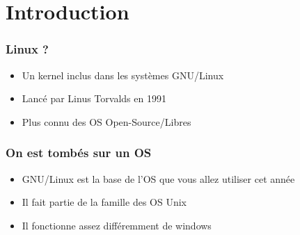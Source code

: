 \section*{Introduction}

\begin{frame}
    \frametitle{Linux ?}
        \begin{itemize}
            \item Un kernel inclus dans les systèmes GNU/Linux
            \item Lancé par Linus Torvalds en 1991
            \item Plus connu des OS Open-Source/Libres
        \end{itemize}
\end{frame}

\begin{frame}
	\frametitle{On est tombés sur un OS}
        \begin{itemize}
            \item GNU/Linux est la base de l'OS que vous allez utiliser cet année
            \item Il fait partie de la famille des OS Unix
            \item Il fonctionne assez différemment de windows 
        \end{itemize}
\end{frame}